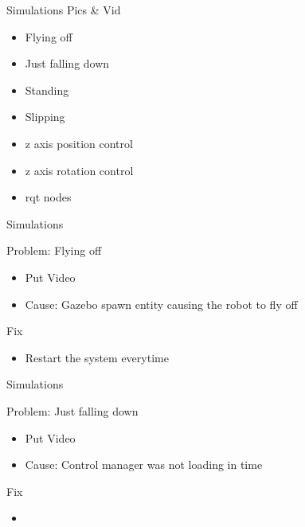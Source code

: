 \documentclass{beamer}
\begin{document}
\begin{frame}{Simulations}
Pics \& Vid
\begin{itemize}
    \item Flying off
    \item Just falling down
    \item Standing
    \item Slipping
    \item z axis position control
    \item z axis rotation control
    \item rqt nodes
\end{itemize}
\end{frame}


\begin{frame}{Simulations}

\begin{block}{Problem: Flying off}
    \begin{itemize}
        \item Put Video
        \item Cause: Gazebo spawn entity causing the robot to fly off
    \end{itemize}
\end{block}

\begin{block}{Fix}
    \begin{itemize}
        \item Restart the system everytime
    \end{itemize}
\end{block}

\end{frame}


\begin{frame}{Simulations}

\begin{block}{Problem: Just falling down}
    \begin{itemize}
        \item Put Video
        \item Cause: Control manager was not loading in time
    \end{itemize}
\end{block}

\begin{block}{Fix}
    \begin{itemize}
        \item 
    \end{itemize}
\end{block}

\end{frame}
\end{document}
